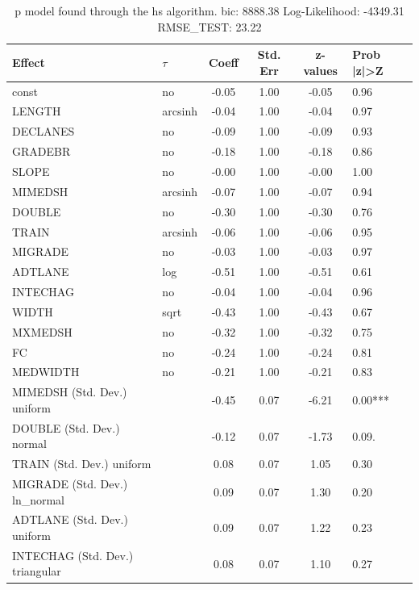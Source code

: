 \begin{table}
	\caption{p model found through the hs algorithm. bic: 8888.38 Log-Likelihood: -4349.31 RMSE_TEST: 23.22}
	\begin{center}
		\begin{tabular}{|l|l|c|c|c|l|}
			\hline
			Effect & $\tau$ & Coeff & Std. Err & z-values & Prob |z|>Z \\
			\hline
			const & no & -0.05 & 1.00 & -0.05 & 0.96 \\
			\hline
			LENGTH & arcsinh & -0.04 & 1.00 & -0.04 & 0.97 \\
			\hline
			DECLANES & no & -0.09 & 1.00 & -0.09 & 0.93 \\
			\hline
			GRADEBR & no & -0.18 & 1.00 & -0.18 & 0.86 \\
			\hline
			SLOPE & no & -0.00 & 1.00 & -0.00 & 1.00 \\
			\hline
			MIMEDSH & arcsinh & -0.07 & 1.00 & -0.07 & 0.94 \\
			\hline
			DOUBLE & no & -0.30 & 1.00 & -0.30 & 0.76 \\
			\hline
			TRAIN & arcsinh & -0.06 & 1.00 & -0.06 & 0.95 \\
			\hline
			MIGRADE & no & -0.03 & 1.00 & -0.03 & 0.97 \\
			\hline
			ADTLANE & log & -0.51 & 1.00 & -0.51 & 0.61 \\
			\hline
			INTECHAG & no & -0.04 & 1.00 & -0.04 & 0.96 \\
			\hline
			WIDTH & sqrt & -0.43 & 1.00 & -0.43 & 0.67 \\
			\hline
			MXMEDSH & no & -0.32 & 1.00 & -0.32 & 0.75 \\
			\hline
			FC & no & -0.24 & 1.00 & -0.24 & 0.81 \\
			\hline
			MEDWIDTH & no & -0.21 & 1.00 & -0.21 & 0.83 \\
			\hline
			MIMEDSH (Std. Dev.) uniform &  & -0.45 & 0.07 & -6.21 & 0.00*** \\
			\hline
			DOUBLE (Std. Dev.) normal &  & -0.12 & 0.07 & -1.73 & 0.09. \\
			\hline
			TRAIN (Std. Dev.) uniform &  & 0.08 & 0.07 & 1.05 & 0.30 \\
			\hline
			MIGRADE (Std. Dev.) ln_normal &  & 0.09 & 0.07 & 1.30 & 0.20 \\
			\hline
			ADTLANE (Std. Dev.) uniform &  & 0.09 & 0.07 & 1.22 & 0.23 \\
			\hline
			INTECHAG (Std. Dev.) triangular &  & 0.08 & 0.07 & 1.10 & 0.27 \\
			\hline

\end{tabular}
\end{center}
\end{table}
